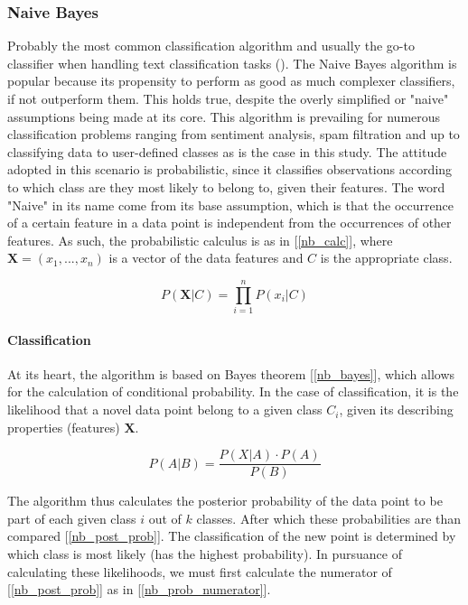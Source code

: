 \subsubsection{Naive Bayes}
	Probably the most common classification algorithm and usually the go-to classifier when handling text classification tasks (\cite{rish2001empirical}). The Naive Bayes algorithm is popular because its propensity to perform as good as much complexer classifiers, if not outperform them. This holds true, despite the overly simplified or "naive" assumptions being made at its core. This algorithm is prevailing for numerous classification problems ranging from sentiment analysis, spam filtration and up to classifying data to user-defined classes as is the case in this study. The attitude adopted in this scenario is probabilistic, since it classifies observations according to which class are they most likely to belong to, given their features. 
	The word "Naive" in its name come from its base assumption, which is that the occurrence of a certain feature in a data point is independent from the occurrences of other features. As such, the probabilistic calculus is as in [\ref{nb_calc}], where $ \textbf{X} = (x_1,...,x_n) $ is a vector of the data features and $ C $ is the appropriate class.
	
	\begin{equation}
		P(\textbf{X}|C) = \prod_{i=1}^n P(x_i|C)
		\label{nb_calc}
	\end{equation}
	
	\paragraph{Classification}
		At its heart, the algorithm is based on Bayes theorem [\ref{nb_bayes}], which allows for the calculation of conditional probability. In the case of classification, it is the likelihood that a novel data point belong to a given class $ C_i $, given its describing properties (features) $ \textbf{X} $.
	
	\begin{equation}
		P(A|B) = \frac{P(X|A) \cdot P(A)}{P(B)}
		\label{nb_bayes}
	\end{equation}
	
		The algorithm thus calculates the posterior probability of the data point to be part of each given class $ i $  out of $ k $ classes. After which these probabilities are than compared [\ref{nb_post_prob}]. The classification of the new point is determined by which class is most likely (has the highest probability). In pursuance of calculating these likelihoods, we must first calculate the numerator of [\ref{nb_post_prob}] as in [\ref{nb_prob_numerator}].
	
